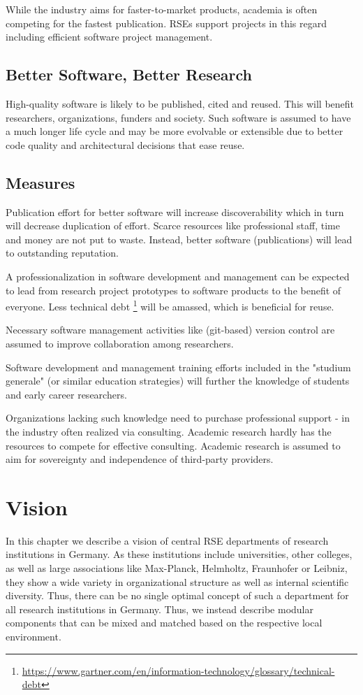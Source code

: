 \documentclass{article}
\begin{document}
While the industry aims for faster-to-market products, academia is often competing for the fastest publication.
RSEs support projects in this regard including efficient software project management.

\subsection{Better Software, Better Research}

High-quality software is likely to be published, cited and reused.
This will benefit researchers, organizations, funders and society.
Such software is assumed to have a much longer life cycle and may be more evolvable or extensible due to better code quality and architectural decisions that ease reuse.

\subsection{Measures}

Publication effort for better software will increase discoverability which in turn will decrease duplication of effort.
Scarce resources like professional staff, time and money are not put to waste. Instead, better software (publications) will lead to outstanding reputation.

A professionalization in software development and management can be expected to lead from research project prototypes to software products to the benefit of everyone.
Less technical debt \footnote{\url{https://www.gartner.com/en/information-technology/glossary/technical-debt}} will be amassed, which is beneficial for reuse.

Necessary software management activities like (git-based) version control are assumed to improve collaboration among researchers.

Software development and management training efforts included in the "studium generale" (or similar education strategies) will further the knowledge of students and early career researchers.

Organizations lacking such knowledge need to purchase professional support - in the industry often realized via consulting.
Academic research hardly has the resources to compete for effective consulting.
Academic research is assumed to aim for sovereignty and independence of third-party providers.

\section{Vision}
\label{sec:vision}
In this chapter we describe a vision of central RSE departments of research institutions in Germany.
As these institutions include universities, other colleges, as well as large associations like Max-Planck, Helmholtz, Fraunhofer or Leibniz,
they show a wide variety in organizational structure as well as internal scientific diversity.
Thus, there can be no single optimal concept of such a department for all research institutions in Germany.
Thus, we instead describe modular components that can be mixed and matched based on the respective local environment.
\end{document}
